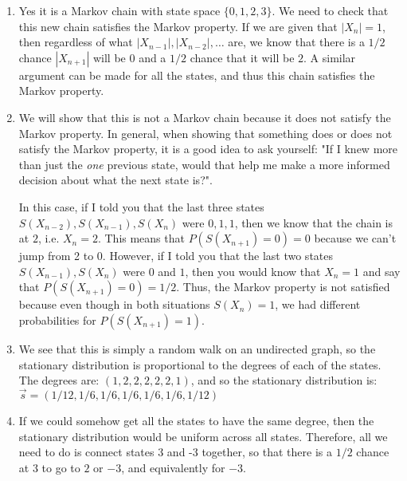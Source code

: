 \documentclass[11.5pt]{article}
\begin{document}
\begin{solution}{5.5} 
\vspace{-0.5em}
\begin{enumerate}
\item Yes it is a Markov chain with state space $\{0, 1, 2, 3\}$. We need to check that this new chain satisfies the Markov property. If we are given that $|X_n| = 1$, then regardless of what $|X_{n-1}|, |X_{n-2}|, \ldots$ are, we know that there is a $1/2$ chance $|X_{n+1}|$ will be 0 and a $1/2$ chance that it will be $2$. A similar argument can be made for all the states, and thus this chain satisfies the Markov property. 

\item We will show that this is not a Markov chain because it does not satisfy the Markov property. In general, when showing that something does or does not satisfy the Markov property, it is a good idea to ask yourself: "If I knew more than just the \textit{one} previous state, would that help me make a more informed decision about what the next state is?". 

In this case, if I told you that the last three states $S(X_{n-2}), S(X_{n-1}), S(X_n)$ were $0,1,1$, then we know that the chain is at $2$, i.e. $X_n = 2$. This means that $P(S(X_{n+1}) = 0) = 0$ because we can't jump from 2 to 0. However, if I told you that the last two states $S(X_{n-1}), S(X_n)$ were $0$ and $1$, then you would know that $X_n = 1$ and say that $P(S(X_{n+1}) = 0) = 1/2$. Thus, the Markov property is not satisfied because even though in both situations $S(X_n) = 1$, we had different probabilities for $P(S(X_{n+1}) = 1)$. 

\item We see that this is simply a random walk on an undirected graph, so the stationary distribution is proportional to the degrees of each of the states. The degrees are: $(1, 2, 2, 2, 2, 2, 1)$, and so the stationary distribution is: $\vec{s} = (1/12, 1/6, 1/6, 1/6, 1/6, 1/6, 1/12)$ 

\item If we could somehow get all the states to have the same degree, then the stationary distribution would be uniform across all states. Therefore, all we need to do is connect states 3 and -3 together, so that there is a $1/2$ chance at 3 to go to $2$ or $-3$, and equivalently for $-3$. 
\end{enumerate}
\end{solution} 

\end{document}
